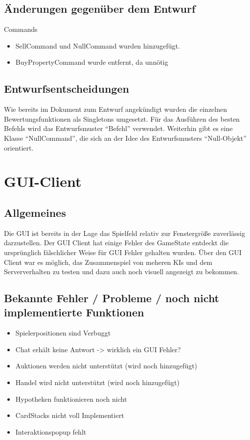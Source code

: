 \documentclass[a4paper,10pt]{article}
\begin{document}
\subsection{Änderungen gegenüber dem Entwurf}
Commands
\begin{itemize}
\item SellCommand und NullCommand wurden hinzugefügt.
\item BuyPropertyCommand wurde entfernt, da unnötig
\end{itemize}
\subsection{Entwurfsentscheidungen}
Wie bereits im Dokument zum Entwurf angekündigt wurden die einzelnen Bewertungsfunktionen als Singletons umgesetzt. Für das Ausführen des besten Befehls wird das Entwurfsmuster ``Befehl'' verwendet. Weiterhin gibt es eine Klasse ``NullCommand'', die sich an der Idee des Entwurfsmusters ``Null-Objekt'' orientiert.
\newpage
\section{GUI-Client}

\subsection{Allgemeines}
Die GUI ist bereits in der Lage das Spielfeld relativ zur Fenstergröße zuverlässig darzustellen.
Der GUI Client hat einige Fehler des GameState entdeckt die ursprünglich fälschlicher Weise für GUI Fehler gehalten wurden. Über den GUI Client war es möglich, das Zusammenspiel von meheren KIs und dem Serververhalten zu testen und dazu auch noch visuell angezeigt zu bekommen.
\subsection{Bekannte Fehler / Probleme / noch nicht implementierte Funktionen}
\begin{itemize}
\item Spielerpositionen sind Verbuggt
\item Chat erhält keine Antwort -> wirklich ein GUI Fehler?
\item Auktionen werden nicht unterstützt (wird noch hinzugefügt)
\item Handel wird nicht unterstützt (wird noch hinzugefügt)
\item Hypotheken funktionieren noch nicht
\item CardStacks nicht voll Implementiert
\item Interaktionspopup fehlt
\end{itemize}
\end{document}
